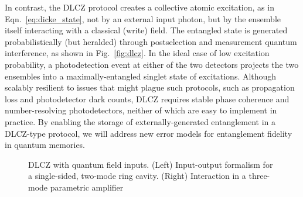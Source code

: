 \documentclass[aps,twocolumn,secnumarabic,amsmath,amssymb,pra,groupedaddress,
showpacs, showkeys,draft]{revtex4-1}
\begin{document}
In contrast, the DLCZ protocol creates a collective atomic excitation, as in
Eqn.~\ref{eq:dicke_state}, not by an external input photon, but by the ensemble
itself interacting with a classical (write) field. The entangled state is
generated probabilistically (but heralded) through postselection and
measurement quantum interference, as shown in Fig.~\ref{fig:dlcz}. In the ideal
case of low excitation probability, a photodetection event at either of the two
detectors projects the two ensembles into a maximally-entangled singlet state
of excitations. Although scalably resilient to issues that might plague such
protocols, such as propagation loss and photodetector dark counts, DLCZ
requires stable phase coherence and number-resolving photodetectors, neither of
which are easy to implement in practice. By enabling the storage of
externally-generated entanglement in a DLCZ-type protocol, we will address new
error models for entanglement fidelity in quantum memories.

\begin{figure}[t]
	\centering
	\resizebox{3.00in}{!}{}
	\resizebox{2.75in}{!}{}
	\caption{DLCZ with quantum field inputs. (Left) Input-output formalism for a single-sided, two-mode ring cavity. (Right) Interaction in a three-mode parametric amplifier}
	\label{fig:ours}
\end{figure}
\end{document}
